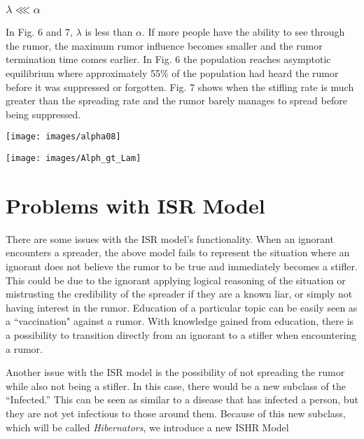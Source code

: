 \documentclass[11pt]{article}
\begin{document}
\subsubsection{$\lambda \lll \alpha$}
In Fig. 6 and 7, $\lambda$ is less than $\alpha$. If more people have the ability to see through the rumor, the maximum rumor influence becomes smaller and the rumor termination time comes earlier. In Fig. 6 the population reaches asymptotic equilibrium where approximately 55\% of the population had heard the rumor before it was suppressed or forgotten. Fig. 7 shows when the stifling rate is much greater than the spreading rate and the rumor barely manages to spread before being suppressed. 

\begin{minipage}{.5\textwidth}
\texttt{[image: images/alpha08]}
 \label{ffc}%
\end{minipage}%
\begin{minipage}{.5\textwidth}
\texttt{[image: images/Alph\_gt\_Lam]}
 \label{ffc}
\end{minipage}%

\section{Problems with ISR Model}
There are some issues with the ISR model's functionality. When an ignorant encounters a spreader, the above model fails to represent the situation where an ignorant does not believe the rumor to be true and immediately becomes a stifler. This could be due to the ignorant applying logical reasoning of the situation or mistrusting the credibility of the spreader if they are a known liar, or simply not having interest in the rumor. Education of a particular topic can be easily seen as a ``vaccination" against a rumor. With knowledge gained from education, there is a possibility to transition directly from an ignorant to a stifler when encountering a rumor.

Another issue with the ISR model is the possibility of not spreading the rumor while also not being a stifler. In this case, there would be a new subclass of the ``Infected.'' This can be seen as similar to a disease that has infected a person, but they are not yet infectious to those around them. Because of this new subclass, which will be called \textit{Hibernators}, we introduce a new ISHR Model
\end{document}
